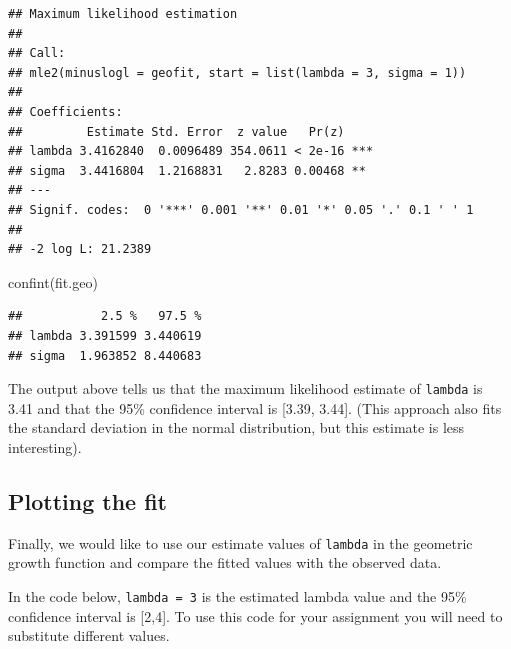\documentclass[
]{book}
\newenvironment{Shaded}{\begin{snugshade}}{\end{snugshade}}
\newcommand{\DecValTok}[1]{\textcolor[rgb]{0.00,0.00,0.81}{#1}}
\newcommand{\FunctionTok}[1]{\textcolor[rgb]{0.00,0.00,0.00}{#1}}
\newcommand{\NormalTok}[1]{#1}
\newcommand{\OtherTok}[1]{\textcolor[rgb]{0.56,0.35,0.01}{#1}}
\newcommand{\SpecialCharTok}[1]{\textcolor[rgb]{0.00,0.00,0.00}{#1}}
\begin{document}
\begin{verbatim}
## Maximum likelihood estimation
## 
## Call:
## mle2(minuslogl = geofit, start = list(lambda = 3, sigma = 1))
## 
## Coefficients:
##         Estimate Std. Error  z value   Pr(z)    
## lambda 3.4162840  0.0096489 354.0611 < 2e-16 ***
## sigma  3.4416804  1.2168831   2.8283 0.00468 ** 
## ---
## Signif. codes:  0 '***' 0.001 '**' 0.01 '*' 0.05 '.' 0.1 ' ' 1
## 
## -2 log L: 21.2389
\end{verbatim}

\begin{Shaded}
\begin{Highlighting}[]
\FunctionTok{confint}\NormalTok{(fit.geo)}
\end{Highlighting}
\end{Shaded}

\begin{verbatim}
##           2.5 %   97.5 %
## lambda 3.391599 3.440619
## sigma  1.963852 8.440683
\end{verbatim}

The output above tells us that the maximum likelihood estimate of \texttt{lambda} is 3.41 and that the 95\% confidence interval is {[}3.39, 3.44{]}. (This approach also fits the standard deviation in the normal distribution, but this estimate is less interesting).

\hypertarget{plotting-the-fit}{%
\subsection{Plotting the fit}\label{plotting-the-fit}}

Finally, we would like to use our estimate values of \texttt{lambda} in the geometric growth function and compare the fitted values with the observed data.

In the code below, \texttt{lambda\ =\ 3} is the estimated lambda value and the 95\% confidence interval is {[}2,4{]}. To use this code for your assignment you will need to substitute different values.

\begin{Shaded}
\end{Shaded}
\end{document}
